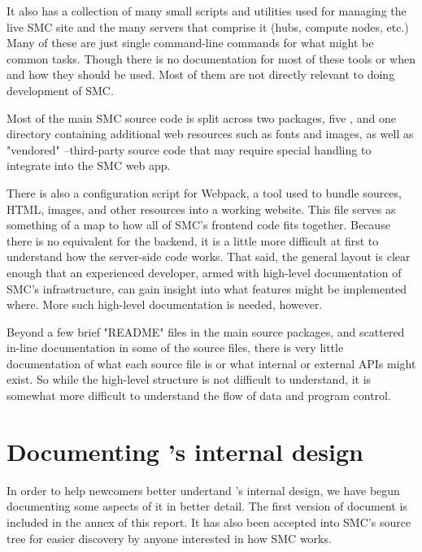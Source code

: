 \documentclass{deliverablereport}
\begin{document}
It also has a collection of many small scripts and utilities used for managing
the live SMC site and the many servers that comprise it (hubs, compute nodes,
etc.)  Many of these are just single command-line commands for what might be
common tasks.  Though there is no documentation for most of these tools or when
and how they should be used.  Most of them are not directly relevant to
doing development of SMC.

Most of the main SMC source code is split across two \Python packages, five
\JavaScript, and one directory containing additional web resources such as
fonts and images, as well as "vendored" \JavaScript--third-party source code
that may require special handling to integrate into the SMC web app.

There is also a configuration script for Webpack,
a tool used to bundle \JavaScript sources, HTML, images, and other resources
into a working website.  This file serves as something of a map to how all of
SMC's frontend code fits together.  Because there is no equivalent for the
backend, it is a little more difficult at first to understand how the
server-side code works.  That said, the general layout is clear enough that an
experienced developer, armed with high-level documentation of SMC's
infrastructure, can gain insight into what features might be implemented where.
More such high-level documentation is needed, however.

Beyond a few brief "README" files in the main source packages, and scattered
in-line documentation in some of the source files, there is very little
documentation of what each source file is or what internal or external APIs
might exist.  So while the high-level structure is not difficult to understand,
it is somewhat more difficult to understand the flow of data and program
control.

\section{Documenting \SMC's internal design}

In order to help newcomers better undertand \SMC's internal design, we have
begun documenting some aspects of it in better detail.  The first version of
document is included in the annex of this report. It has also been accepted
into SMC's source tree for easier discovery by anyone interested in how SMC
works.
\end{document}

